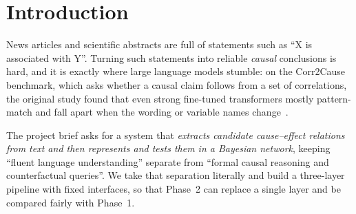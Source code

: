 \documentclass[11pt,a4paper]{article}
\begin{document}
\vspace{0.8em}
{\sffamily
\setcounter{tocdepth}{1}
\renewcommand{\contentsname}{\large Contents}
\tableofcontents}

\newpage
\section{Introduction}

News articles and scientific abstracts are full of statements such as ``X is associated with Y''.
Turning such statements into reliable \emph{causal} conclusions is hard, and it is exactly where
large language models stumble: on the Corr2Cause benchmark, which asks whether a causal claim follows
from a set of correlations, the original study found that even strong fine-tuned transformers mostly
pattern-match and fall apart when the wording or variable names change~\cite{jin2024corr2cause}.

The project brief asks for a system that \emph{extracts candidate cause--effect relations from text and
then represents and tests them in a Bayesian network}, keeping ``fluent language understanding'' separate
from ``formal causal reasoning and counterfactual queries''. We take that separation literally and build a
three-layer pipeline with fixed interfaces, so that Phase~2 can replace a single layer and be compared
fairly with Phase~1.
\end{document}
